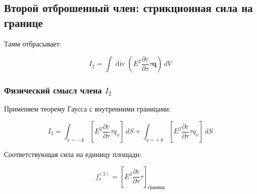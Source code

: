 \documentclass[a4paper,10pt]{article}
\newcommand{\modblock}[1]{\colorbox{modcolor!10}{\parbox{\dimexpr\linewidth-2\fboxsep}{#1}}}
\begin{document}
\modblock{

\subsection{Второй отброшенный член: стрикционная сила на границе}






Тамм отбрасывает:

\begin{equation}
\boxed{
I_2 = \int \operatorname{div}\!\left(E^2\frac{\partial\varepsilon}{\partial\tau}
\tau\mathbf{q}\right)\,dV
}
\label{eq:discarded_term_2}
\end{equation}


}%

\modblock{


\subsubsection{Физический смысл члена $I_2$}

Применяем теорему Гаусса с внутренними границами:

\begin{equation}
I_2 = \int_{x=-A} \left[E^2\frac{\partial\varepsilon}{\partial\tau}
\tau q_x\right]\,dS + \int_{x=+A} \left[E^2\frac{\partial\varepsilon}{\partial\tau}
\tau q_x\right]\,dS
\label{eq:term_2_gauss}
\end{equation}

Соответствующая сила на единицу площади:

\begin{equation}
\boxed{
f_x^{(2)} = \left[E^2\frac{\partial\varepsilon}{\partial\tau}\tau\right]_{\text{граница}}
}
\label{eq:force_term_2}
\end{equation}

}%
\end{document}
